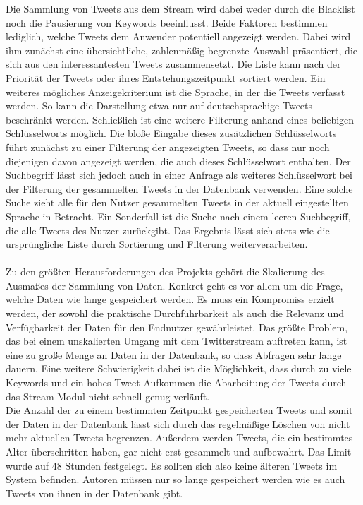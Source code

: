 Die Sammlung von Tweets aus dem Stream wird dabei weder durch die Blacklist noch die Pausierung von Keywords beeinflusst. Beide Faktoren bestimmen lediglich, welche Tweets dem Anwender potentiell angezeigt werden. Dabei wird ihm zunächst eine übersichtliche, zahlenmäßig begrenzte Auswahl präsentiert, die sich aus den interessantesten Tweets zusammensetzt. Die Liste kann nach der Priorität der Tweets oder ihres Entstehungszeitpunkt sortiert werden. Ein weiteres mögliches Anzeigekriterium ist die Sprache, in der die Tweets verfasst werden. So kann die Darstellung etwa nur auf deutschsprachige Tweets beschränkt werden. Schließlich ist eine weitere Filterung anhand eines beliebigen Schlüsselworts möglich. Die bloße Eingabe dieses zusätzlichen Schlüsselworts führt zunächst zu einer Filterung der angezeigten Tweets, so dass nur noch diejenigen davon angezeigt werden, die auch dieses Schlüsselwort enthalten. Der Suchbegriff lässt sich jedoch auch in einer Anfrage als weiteres Schlüsselwort bei der Filterung der gesammelten Tweets in der Datenbank verwenden. Eine solche Suche zieht alle für den Nutzer gesammelten Tweets in der aktuell eingestellten Sprache in Betracht. Ein Sonderfall ist die Suche nach einem leeren Suchbegriff, die alle Tweets des Nutzer zurückgibt. Das Ergebnis lässt sich stets wie die ursprüngliche Liste durch Sortierung und Filterung weiterverarbeiten.
\\\\ %
Zu den größten Herausforderungen des Projekts gehört die Skalierung des Ausmaßes der Sammlung von Daten. Konkret geht es vor allem um die Frage, welche Daten wie lange gespeichert werden. Es muss ein Kompromiss erzielt werden, der sowohl die praktische Durchführbarkeit als auch die Relevanz und Verfügbarkeit der Daten für den Endnutzer gewährleistet. Das größte Problem, das bei einem unskalierten Umgang mit dem Twitterstream auftreten kann, ist eine zu große Menge an Daten in der Datenbank, so dass Abfragen sehr lange dauern. Eine weitere Schwierigkeit dabei ist die Möglichkeit, dass durch zu viele Keywords und ein hohes Tweet-Aufkommen die Abarbeitung der Tweets durch das Stream-Modul nicht schnell genug verläuft. \\
Die Anzahl der zu einem bestimmten Zeitpunkt gespeicherten Tweets und somit der Daten in der Datenbank lässt sich durch das regelmäßige Löschen von nicht mehr aktuellen Tweets begrenzen. Außerdem werden Tweets, die ein bestimmtes Alter überschritten haben, gar nicht erst gesammelt und aufbewahrt. Das Limit wurde auf 48 Stunden festgelegt. Es sollten sich also keine älteren Tweets im System befinden. Autoren müssen nur so lange gespeichert werden wie es auch Tweets von ihnen in der Datenbank gibt. \\
